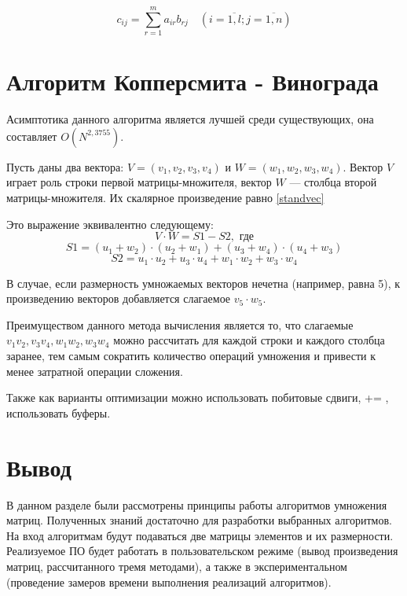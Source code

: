 \begin{equation}
	\label{standvec}
	c_{ij} =
	\sum_{r=1}^{m} a_{ir}b_{rj} \quad (i=\overline{1,l}; j=\overline{1,n})
\end{equation}

\section{Алгоритм Копперсмита - Винограда}

Асимптотика данного алгоритма является лучшей среди существующих, она составляет $O(N^{2,3755})$.

Пусть даны два вектора: $V = (v_1, v_2, v_3, v_4)$ и $W = (w_1, w_2, w_3, w_4)$. Вектор $V$ играет роль строки первой матрицы-множителя, вектор $W$ --- столбца второй матрицы-множителя. Их скалярное произведение равно \ref{standvec}

Это выражение эквивалентно следующему:
\begin{equation}
	V \cdot W = S1 - S2, \text{ где}
\end{equation}
\begin{equation*}
	S1 = (u_1 + w_2) \cdot (u_2 + w_1) + (u_3 + w_4) \cdot (u_4 + w_3)
\end{equation*}
\begin{equation*}
	S2 = u_1 \cdot u_2 + u_3 \cdot u_4 + w_1 \cdot w_2 + w_3 \cdot w_4
\end{equation*}

В случае, если размерность умножаемых векторов нечетна (например, равна 5), к произведению векторов добавляется слагаемое $v_5 \cdot w_5$.

Преимуществом данного метода вычисления является то, что слагаемые $v_1v_2, v_3v_4, w_1w_2, w_3w_4$ можно рассчитать для каждой строки и каждого столбца заранее, тем самым сократить количество операций умножения и привести к менее затратной операции сложения.

Также как варианты оптимизации можно использовать побитовые сдвиги, += , использовать буферы.

\section*{Вывод}

В данном разделе были рассмотрены принципы работы алгоритмов умножения матриц. Полученных знаний достаточно для разработки выбранных алгоритмов. На вход алгоритмам будут подаваться две матрицы элементов и их размерности. Реализуемое ПО будет работать в пользовательском режиме (вывод произведения матриц, рассчитанного тремя методами), а также в экспериментальном (проведение замеров времени выполнения реализаций алгоритмов).